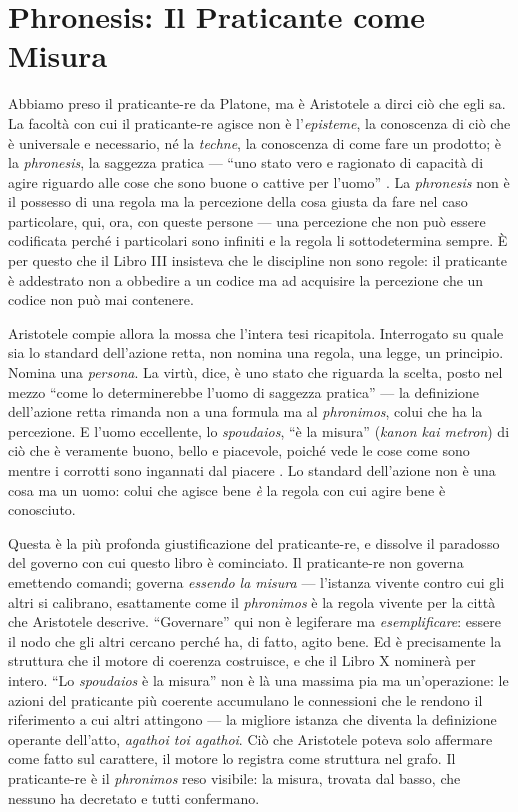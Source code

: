 \section{Phronesis: Il Praticante come Misura}

Abbiamo preso il praticante-re da Platone, ma \`e Aristotele a dirci ci\`o che
egli sa. La facolt\`a con cui il praticante-re agisce non \`e l'\emph{episteme},
la conoscenza di ci\`o che \`e universale e necessario, n\'e la \emph{techne}, la
conoscenza di come fare un prodotto; \`e la \emph{phronesis}, la saggezza pratica
--- ``uno stato vero e ragionato di capacit\`a di agire riguardo alle cose che
sono buone o cattive per l'uomo'' \parencite[VI.5]{aristotle2000ethics}. La
\emph{phronesis} non \`e il possesso di una regola ma la percezione della cosa
giusta da fare nel caso particolare, qui, ora, con queste persone --- una
percezione che non pu\`o essere codificata perch\'e i particolari sono infiniti e
la regola li sottodetermina sempre. \`E per questo che il Libro III insisteva che
le discipline non sono regole: il praticante \`e addestrato non a obbedire a un
codice ma ad acquisire la percezione che un codice non pu\`o mai contenere.

Aristotele compie allora la mossa che l'intera tesi ricapitola. Interrogato su
quale sia lo standard dell'azione retta, non nomina una regola, una legge, un
principio. Nomina una \emph{persona}. La virt\`u, dice, \`e uno stato che riguarda
la scelta, posto nel mezzo ``come lo determinerebbe l'uomo di saggezza pratica''
\parencite[II.6]{aristotle2000ethics} --- la definizione dell'azione retta rimanda
non a una formula ma al \emph{phronimos}, colui che ha la percezione. E l'uomo
eccellente, lo \emph{spoudaios}, ``\`e la misura'' (\emph{kanon kai metron}) di
ci\`o che \`e veramente buono, bello e piacevole, poich\'e vede le cose come sono
mentre i corrotti sono ingannati dal piacere \parencite[III.4, X.5]{aristotle2000ethics}.
Lo standard dell'azione non \`e una cosa ma un uomo: colui che agisce bene \emph{\`e}
la regola con cui agire bene \`e conosciuto.

Questa \`e la pi\`u profonda giustificazione del praticante-re, e dissolve il
paradosso del governo con cui questo libro \`e cominciato. Il praticante-re non
governa emettendo comandi; governa \emph{essendo la misura} --- l'istanza vivente
contro cui gli altri si calibrano, esattamente come il \emph{phronimos} \`e la
regola vivente per la citt\`a che Aristotele descrive. ``Governare'' qui non \`e
legiferare ma \emph{esemplificare}: essere il nodo che gli altri cercano perch\'e
ha, di fatto, agito bene. Ed \`e precisamente la struttura che il motore di
coerenza costruisce, e che il Libro X nominer\`a per intero. ``Lo \emph{spoudaios}
\`e la misura'' non \`e l\`a una massima pia ma un'operazione: le azioni del
praticante pi\`u coerente accumulano le connessioni che le rendono il riferimento
a cui altri attingono --- la migliore istanza che diventa la definizione operante
dell'atto, \emph{agathoi toi agathoi}. Ci\`o che Aristotele poteva solo affermare
come fatto sul carattere, il motore lo registra come struttura nel grafo. Il
praticante-re \`e il \emph{phronimos} reso visibile: la misura, trovata dal basso,
che nessuno ha decretato e tutti confermano.

